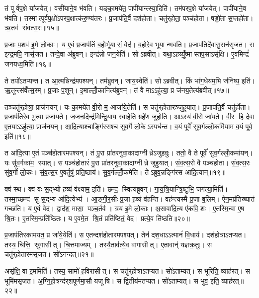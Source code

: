 तं पूर्वप॒क्षे या॑जयेत्। वसी॑याने॒व भ॑वति। यङ्का॒मये॑त॒ पापी॑यान्त्स्या॒दिति॑। तम॑परप॒क्षे या॑जयेत्। पापी॑याने॒व भ॑वति। तस्मात्पूर्वप॒क्षो॑ऽपरप॒क्षात्क॑रु॒ण्य॑तरः। प्र॒जाप॑ति॒र्वै दश॑होता। चतु॑र्‌होता॒ पञ्च॑होता। षड्ढो॑ता स॒प्तहो॑ता। ऋ॒तव॑ संवत्स॒रः॥१५॥

प्र॒जाः प॒शव॑ इ॒मे लो॒काः। य ए॒वं प्र॒जाप॑तिं ब॒होर्भूयासं॒ वेद॑। ब॒होरे॒व भूयान्भवति। प्र॒जाप॑तिर्देवासु॒रान॑सृजत। स इन्द्र॒मपि॒ नासृ॑जत। तन्दे॒वा अ॑ब्रुवन्। इन्द्र॑न्नो जन॒येति॑। सोऽब्रवीत्। यथा॒ऽहय्युँ॒ष्मास्तप॒साऽसृ॑क्षि। ए॒वमिन्द्रं॑ जनयध्व॒मिति॑॥१६॥

ते तपो॑ऽतप्यन्त। त आ॒त्मन्निन्द्र॑मपश्यन्। तम॑ब्रुवन्। जाय॒स्वेति॑। सोऽब्रवीत्। किं भा॑ग॒धेय॑म॒भि ज॑निष्य॒ इति॑। ऋ॒तून्त्स॑वँत्स॒रम्। प्र॒जाः प॒शून्। इ॒माल्लोँ॒कानित्य॑ब्रुवन्। तं वै माऽऽहु॑त्या॒ प्र ज॑नय॒तेत्य॑ब्रवीत्॥१७॥

तञ्चतु॑र्‌होत्रा॒ प्राज॑नयन्। यः का॒मये॑त वी॒रो म॒ आजा॑ये॒तेति॑। स चतु॑र्‌होतारञ्जुहुयात्। प्र॒जाप॑ति॒र्वै चतु॑र्होता। प्र॒जाप॑तिरे॒व भू॒त्वा प्रजा॑यते। ज॒जन॒दिन्द्र॑मिन्द्रि॒याय॒ स्वाहेति॒ ग्रहे॑ण जुहोति। आऽस्य॑ वी॒रो जा॑यते। वी॒र हि दे॒वा ए॒तयाऽऽहु॑त्या॒ प्राज॑नयन्। आ॒दि॒त्याश्चाङ्गि॑रसश्च सुव॒र्गे लो॒केऽस्पर्धन्त। व॒यं पूर्वे॑ सुव॒र्गल्लोँ॒कमि॑याम व॒यं पूर्व॒ इति॑॥१८॥

त आ॑दि॒त्या ए॒तं पञ्च॑होतारमपश्यन्। तं पु॒रा प्रा॑तरनुवा॒कादाग्नीध्रेऽजुहवुः। ततो॒ वै ते पूर्वे॑ सुव॒र्गल्लोँ॒कमा॑यन्। यः सु॑व॒र्गका॑म॒ स्यात्। स पञ्च॑होतारं पु॒रा प्रा॑तरनुवा॒कादाग्नीध्रे जुहुयात्। सं॒व॒त्स॒रो वै पञ्च॑होता। सं॒व॒त्स॒रः सु॑व॒र्गो लो॒कः। सं॒व॒त्स॒र ए॒वर्तुषु॑ प्रति॒ष्ठाय॑। सु॒व॒र्गल्लोँ॒कमे॑ति। तेऽब्रुव॒न्नङ्गि॑रस आदि॒त्यान्॥१९॥

क्व॑ स्थ। क्व॑ वः स॒द्भ्यो ह॒व्यं व॑क्ष्याम॒ इति॑। छन्द॒ स्वित्य॑ब्रुवन्। गा॒य॒त्रि॒यान्त्रि॒ष्टुभि॒ जग॑त्या॒मिति॑। तस्मा॒च्छन्द॑ सु स॒द्भ्य आ॑दि॒त्येभ्य॑। आ॒ङ्गी॒र॒सीः प्र॒जा ह॒व्यं व॑हन्ति। वह॑न्त्यस्मै प्र॒जा ब॒लिम्। ऐन॒मप्र॑तिख्यातं गच्छति। य ए॒वं वेद॑। द्वाद॑श॒ मासा॒ पञ्च॒र्तव॑। त्रय॑ इ॒मे लो॒काः। अ॒सावा॑दि॒त्य ए॑कवि॒शः। ए॒तस्मि॒न्वा ए॒ष श्रि॒तः। ए॒तस्मि॒न्प्रति॑ष्ठितः। य ए॒वमे॒त श्रि॒तं प्रति॑ष्ठितं॒ वेद॑। प्रत्ये॒व ति॑ष्ठति॥२०॥\anuvakamend[स्या॒दिति॑ संवत्स॒रो ज॑नयध्व॒मितीत्य॑ब्रवी॒त्पूर्व॒ इत्या॑दि॒त्यानृ॒तव॒ष्षट्च॑]

प्र॒जाप॑तिरकामयत॒ प्र जा॑ये॒येति॑। स ए॒तन्दश॑होतारमपश्यत्। तेन॑ दश॒धाऽऽत्मानं॑ वि॒धाय॑। दश॑होत्राऽतप्यत। तस्य॒ चित्ति॒ स्रुगासीत्। चि॒त्तमाज्यम्। तस्यै॒ताव॑त्ये॒व वागासीत्। ए॒तावान्॑ यज्ञक्र॒तुः। स चतु॑र्‌होतारमसृजत। सो॑ऽनन्दत्॥२१॥

असृ॑क्षि॒ वा इ॒ममिति॑। तस्य॒ सामो॑ ह॒विरासीत्। स चतु॑र्‌होत्राऽतप्यत। सो॑ऽताम्यत्। स भूरिति॒ व्याह॑रत्। स भूमि॑मसृजत। अ॒ग्नि॒हो॒त्रन्द॑र्‌शपूर्णमा॒सौ यजूषि। स द्वि॒तीय॑मतप्यत। सो॑ऽताम्यत्। स भुव॒ इति॒ व्याह॑रत्॥२२॥

